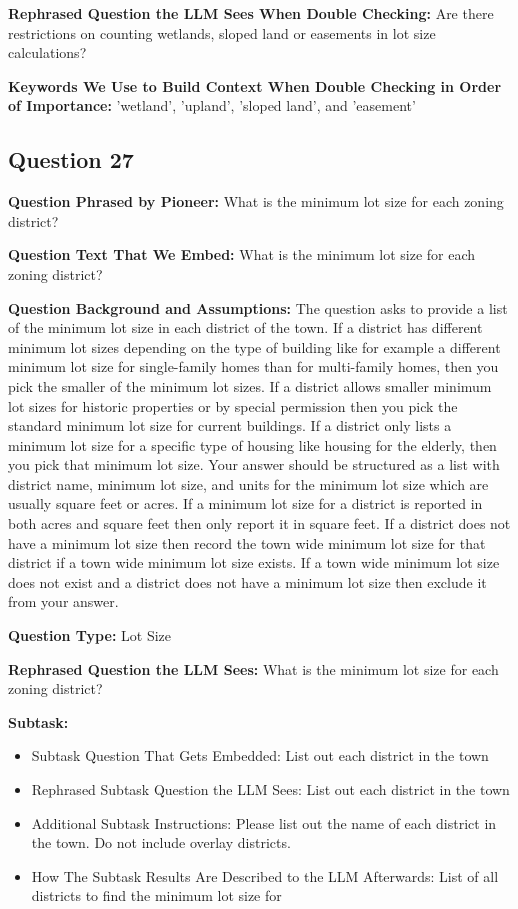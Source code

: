 \noindent\textbf{Rephrased Question the LLM Sees When Double Checking:} Are there restrictions on counting wetlands, sloped land or easements in lot size calculations?

\noindent\textbf{Keywords We Use to Build Context When Double Checking in Order of Importance:}
\noindent 'wetland', 'upland', 'sloped land', and 'easement'
\vspace{1cm}
\subsection*{Question 27}
\noindent\textbf{Question Phrased by Pioneer:} What is the minimum lot size for each zoning district?

\noindent\textbf{Question Text That We Embed:} What is the minimum lot size for each zoning district?

\noindent\textbf{Question Background and Assumptions:} The question asks to provide a list of the minimum lot size in each district of the town. If a district has different minimum lot sizes depending on the type of building like for example a different minimum lot size for single-family homes than for multi-family homes, then you pick the smaller of the minimum lot sizes. If a district allows smaller minimum lot sizes for historic properties or by special permission then you pick the standard minimum lot size for current buildings. If a district only lists a minimum lot size for a specific type of housing like housing for the elderly, then you pick that minimum lot size. Your answer should be structured as a list with district name, minimum lot size, and units for the minimum lot size which are usually square feet or acres. If a minimum lot size for a district is reported in both acres and square feet then only report it in square feet. If a district does not have a minimum lot size then record the town wide minimum lot size for that district if a town wide minimum lot size exists. If a town wide minimum lot size does not exist and a district does not have a minimum lot size then exclude it from your answer.

\noindent\textbf{Question Type:} Lot Size

\noindent\textbf{Rephrased Question the LLM Sees:} What is the minimum lot size for each zoning district?

\noindent\textbf{Subtask:}
\begin{itemize}
\item Subtask Question That Gets Embedded: List out each district in the town
\item Rephrased Subtask Question the LLM Sees: List out each district in the town
\item Additional Subtask Instructions: Please list out the name of each district in the town. Do not include overlay districts.
\item How The Subtask Results Are Described to the LLM Afterwards: List of all districts to find the minimum lot size for
\end{itemize}

